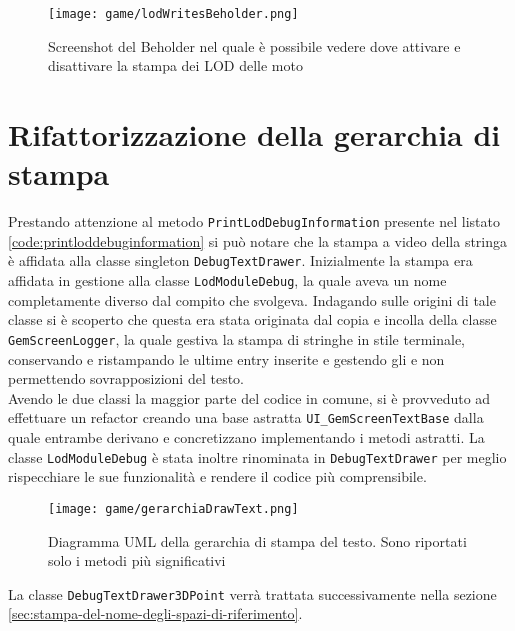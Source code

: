 \begin{figure}[h!] 
	\centering 
	\hspace*{-0.05\columnwidth}\texttt{[image: game/lodWritesBeholder.png]} 
	\caption{Screenshot del Beholder nel quale è possibile vedere dove attivare e disattivare la stampa dei LOD delle moto}
\end{figure}


\section{Rifattorizzazione della gerarchia di stampa}

Prestando attenzione al metodo \texttt{PrintLodDebugInformation} presente nel listato \ref{code:printloddebuginformation} si può notare che la stampa a video della stringa è affidata alla classe singleton \texttt{DebugTextDrawer}. Inizialmente la stampa era affidata in gestione alla classe \texttt{LodModuleDebug}, la quale aveva un nome completamente diverso dal compito che svolgeva. Indagando sulle origini di tale classe si è scoperto che questa era stata originata dal copia e incolla della classe \texttt{GemScreenLogger}, la quale gestiva la stampa di stringhe in stile terminale, conservando e ristampando le ultime entry inserite e gestendo gli  e non permettendo sovrapposizioni del testo.\\

Avendo le due classi la maggior parte del codice in comune, si è provveduto ad effettuare un refactor creando una base astratta \texttt{UI\_GemScreenTextBase} dalla quale entrambe derivano e concretizzano implementando i metodi astratti. La classe \texttt{LodModuleDebug} è stata inoltre rinominata in \texttt{DebugTextDrawer} per meglio rispecchiare le sue funzionalità e rendere il codice più comprensibile.\\

\begin{figure}[h!] 
	\centering 
	\texttt{[image: game/gerarchiaDrawText.png]} 
	\caption{Diagramma UML della gerarchia di stampa del testo. Sono riportati solo i metodi più significativi}
\end{figure}

La classe \texttt{DebugTextDrawer3DPoint} verrà trattata successivamente nella sezione \ref{sec:stampa-del-nome-degli-spazi-di-riferimento}.\\

